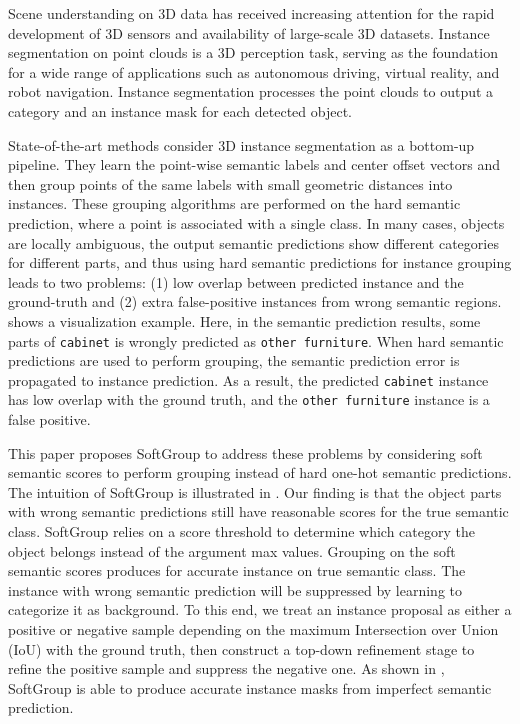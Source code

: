 \documentclass[10pt,twocolumn,letterpaper]{article}
\begin{document}
	Scene understanding on 3D data has received increasing attention for the rapid development of 3D sensors and availability of large-scale 3D datasets. Instance segmentation on point clouds is a 3D perception task, serving as the foundation for a wide range of applications such as autonomous driving, virtual reality, and robot navigation. Instance segmentation processes the point clouds to output a category and an instance mask for each detected object. 
	
	State-of-the-art methods \cite{jiang2020pointgroup,liang2021instance,chen2021hierarchical} consider 3D instance segmentation as a bottom-up pipeline. They learn the point-wise semantic labels and center offset vectors and then group points of the same labels with small geometric distances into instances. These grouping algorithms are performed on the hard semantic prediction, where a point is associated with a single class. In many cases, objects are locally ambiguous, the output semantic predictions show different categories for different parts, and thus using hard semantic predictions for instance grouping leads to two problems: (1) low overlap between predicted instance and the ground-truth and (2) extra false-positive instances from wrong semantic regions.  shows a visualization example. Here, in the semantic prediction results, some parts of \texttt{cabinet} is wrongly predicted as \texttt{other furniture}. When hard semantic predictions are used to perform grouping, the semantic prediction error is propagated to instance prediction. As a result, the predicted \texttt{cabinet} instance has low overlap with the ground truth, and the \texttt{other furniture} instance is a false positive. 
	
	This paper proposes SoftGroup to address these problems by considering soft semantic scores to perform grouping instead of hard one-hot semantic predictions. The intuition of SoftGroup is illustrated in . Our finding is that the object parts with wrong semantic predictions still have reasonable scores for the true semantic class. SoftGroup relies on a score threshold to determine which category the object belongs instead of the argument max values. Grouping on the soft semantic scores produces for accurate instance on true semantic class. The instance with wrong semantic prediction will be suppressed by learning to categorize it as background. To this end, we treat an instance proposal as either a positive or negative sample depending on the maximum Intersection over Union (IoU) with the ground truth, then construct a top-down refinement stage to refine the positive sample and suppress the negative one. As shown in , SoftGroup is able to produce accurate instance masks from imperfect semantic prediction. 
	
\end{document}
